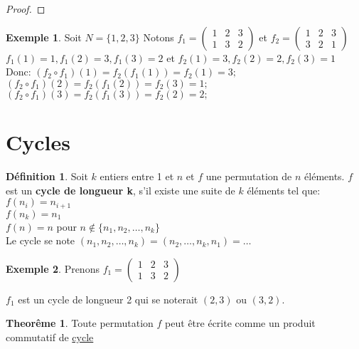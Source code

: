\documentclass[12pt]{book}
\theoremstyle{definition}
\newtheorem{definition}{Définition}[section]
\newtheorem*{example}{Exemple}
\newtheorem{theorem}{Theorême}[section]
\begin{document}
\begin{proof}
\end{proof}

\begin{example}
    Soit $N = \{1, 2, 3 \}$ Notons $f_1 = \begin{pmatrix}
        1 & 2 & 3 \\
        1 & 3 & 2 
    \end{pmatrix}$ et $f_2 = \begin{pmatrix}
        1 & 2 & 3 \\ 
        3 & 2 & 1 
    \end{pmatrix}$
    $f_1(1) = 1, f_1(2) = 3, f_1(3) = 2$
    et $f_2(1) = 3, f_2(2) = 2, f_2(3) = 1$
    Donc: $(f_2 \circ f_1)(1) = f_2(f_1(1)) = f_2(1) = 3;$ \\
    $ (f_2 \circ f_1)(2) = f_2(f_1(2)) = f_2(3) = 1;$ \\ 
    $(f_2 \circ f_1)(3) = f_2(f_1(3)) = f_2(2) = 2; $ \\
\end{example}

\section{Cycles}

\begin{definition}
    \label{def:cycle}
    Soit $k$ entiers entre 1 et $n$ et $f$ une permutation de $n$ éléments. $f$ est un \textbf{cycle de longueur k}, s'il existe une 
    suite de $k$ éléments tel que:
    $f(n_i) = n_{i+1}$ \\
    $f(n_k) = n_1$ \\
    $f(n) = n$ pour $n \notin \{n_1, n_2, \dots, n_k\}$ \\ 
    Le cycle se note $(n_1, n_2, \dots, n_k) = (n_2, \dots, n_k, n_1) = \dots $
\end{definition}

\begin{example}
    Prenons $f_1 = \begin{pmatrix}
        1 & 2 & 3 \\
        1 & 3 & 2 
    \end{pmatrix}$

    $f_1$ est un cycle de longueur 2 qui se noterait $(2, 3)$ ou $(3, 2)$.
\end{example}

\begin{theorem}
    Toute permutation $f$ peut être écrite comme un produit commutatif de \hyperref[def:cycle]{cycle}
\end{theorem}
\end{document}
